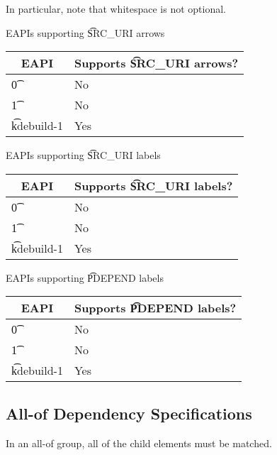 In particular, note that whitespace is not optional.

\IFKDEBUILDELSE
{
    \begin{centertable}{EAPIs supporting \t{SRC\_URI} arrows} \label{uri-arrows-table}
    \begin{tabular}{ l l }
        \toprule
        \multicolumn{1}{c}{\textbf{EAPI}} &
        \multicolumn{1}{c}{\textbf{Supports \t{SRC\_URI} arrows?}} \\
        \midrule
    \t{0} & No \\
    \t{1} & No \\
    \t{kdebuild-1} & Yes \\
    \bottomrule
    \end{tabular}
    \end{centertable}

    \begin{centertable}{EAPIs supporting \t{SRC\_URI} labels} \label{uri-labels-table}
    \begin{tabular}{ l l }
        \toprule
        \multicolumn{1}{c}{\textbf{EAPI}} &
        \multicolumn{1}{c}{\textbf{Supports \t{SRC\_URI} labels?}} \\
        \midrule
    \t{0} & No \\
    \t{1} & No \\
    \t{kdebuild-1} & Yes \\
    \bottomrule
    \end{tabular}
    \end{centertable}

    \begin{centertable}{EAPIs supporting \t{PDEPEND} labels} \label{pdepend-labels-table}
    \begin{tabular}{ l l }
        \toprule
        \multicolumn{1}{c}{\textbf{EAPI}} &
        \multicolumn{1}{c}{\textbf{Supports \t{PDEPEND} labels?}} \\
        \midrule
    \t{0} & No \\
    \t{1} & No \\
    \t{kdebuild-1} & Yes \\
    \bottomrule
    \end{tabular}
    \end{centertable}
}{
}

\subsection{All-of Dependency Specifications}

In an all-of group, all of the child elements must be matched.

